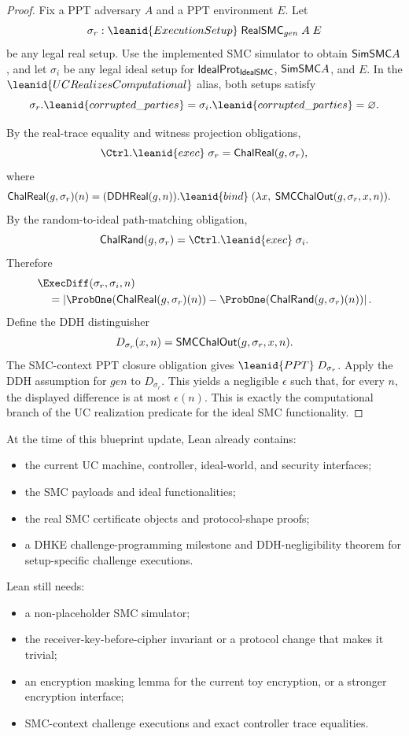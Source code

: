 \begin{proof}
Fix a PPT adversary \(A\) and a PPT environment \(E\).  Let
\[
  \sigma_r :
    \leanid{ExecutionSetup}\;
      \RealSMC_{gen}\;A\;E
\]
be any legal real setup.  Use the implemented SMC simulator to obtain
\(\mathsf{SimSMC} A\), and let \(\sigma_i\) be any legal ideal setup for
\(\mathsf{IdealProt}_{\mathsf{IdealSMC}}\), \(\mathsf{SimSMC} A\), and \(E\).  In the
\(\leanid{UCRealizesComputational}\) alias, both setups satisfy
\[
  \sigma_r.\leanid{corrupted\_parties}
  =
  \sigma_i.\leanid{corrupted\_parties}
  =
  \varnothing .
\]

By the real-trace equality and witness projection obligations,
\[
  \Ctrl.\leanid{exec}\;\sigma_r
  =
  \ChalReal(g,\sigma_r),
\]
where
\[
\begin{aligned}
  \ChalReal(g,\sigma_r)(n)
  &=
  (\DDHReal(g,n)).\leanid{bind}\;
    (\lambda x,\;\SMCChalOut(g,\sigma_r,x,n)).
\end{aligned}
\]
By the random-to-ideal path-matching obligation,
\[
  \ChalRand(g,\sigma_r)=\Ctrl.\leanid{exec}\;\sigma_i .
\]
Therefore
\[
\begin{aligned}
&\ExecDiff(\sigma_r,\sigma_i,n)\\
&\quad =
\left|
  \ProbOne(\ChalReal(g,\sigma_r)(n))
  -
  \ProbOne(\ChalRand(g,\sigma_r)(n))
\right|.
\end{aligned}
\]
Define the DDH distinguisher
\[
  D_{\sigma_r}(x,n)
  =
  \mathsf{SMCChalOut}(g,\sigma_r,x,n).
\]
The SMC-context PPT closure obligation gives \(\leanid{PPT}\;D_{\sigma_r}\).
Apply the DDH assumption for \(gen\) to \(D_{\sigma_r}\).  This yields a
negligible \(\epsilon\) such that, for every \(n\), the displayed difference is
at most \(\epsilon(n)\).  This is exactly the computational branch of the UC
realization predicate for the ideal SMC functionality.
\end{proof}

\begin{corollary}
At the time of this blueprint update, Lean already contains:
\begin{itemize}
\item the current UC machine, controller, ideal-world, and security interfaces;
\item the SMC payloads and ideal functionalities;
\item the real SMC certificate objects and protocol-shape proofs;
\item a DHKE challenge-programming milestone and DDH-negligibility theorem for
setup-specific challenge executions.
\end{itemize}
Lean still needs:
\begin{itemize}
\item a non-placeholder SMC simulator;
\item the receiver-key-before-cipher invariant or a protocol change that makes
it trivial;
\item an encryption masking lemma for the current toy encryption, or a stronger
encryption interface;
\item SMC-context challenge executions and exact controller trace equalities.
\end{itemize}
\end{corollary}
